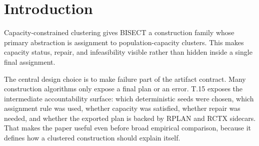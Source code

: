 \section{Introduction}

Capacity-constrained clustering gives BISECT a construction family whose
primary abstraction is assignment to population-capacity clusters. This makes
capacity status, repair, and infeasibility visible rather than hidden inside a
single final assignment.

The central design choice is to make failure part of the artifact contract.
Many construction algorithms only expose a final plan or an error. T.15 exposes
the intermediate accountability surface: which deterministic seeds were chosen,
which assignment rule was used, whether capacity was satisfied, whether repair
was needed, and whether the exported plan is backed by RPLAN and RCTX sidecars.
That makes the paper useful even before broad empirical comparison, because it
defines how a clustered construction should explain itself.
